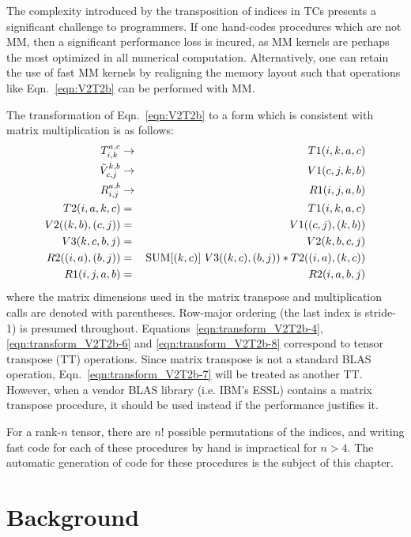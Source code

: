 \documentclass[letterpaper,12pt]{article}
\begin{document}
The complexity introduced by the transposition of indices in TCs presents a significant challenge to programmers.  If one hand-codes procedures which are not MM, then a significant performance loss is incured, as MM kernels are perhaps the most optimized in all numerical computation.  Alternatively, one can retain the use of fast MM kernels by realigning the memory layout such that operations like Eqn.~\ref{eqn:V2T2b} can be performed with MM.

The transformation of Eqn.~\ref{eqn:V2T2b} to a form which is consistent with matrix multiplication is as follows:
\begin{eqnarray}
 \label{eqn:transform_V2T2b-1}
 T^{a,c}_{i,k} &\rightarrow& T1(i,k,a,c) \\
 \label{eqn:transform_V2T2b-2}
 \tilde{V}^{k,b}_{c,j} &\rightarrow& V1(c,j,k,b) \\
 \label{eqn:transform_V2T2b-3}
 R^{a,b}_{i,j} &\rightarrow& R1(i,j,a,b) \\
 \label{eqn:transform_V2T2b-4}
 T2(i,a,k,c) &=& T1(i,k,a,c) \\
 \label{eqn:transform_V2T2b-5}
 V2((k,b),(c,j)) &=& V1((c,j),(k,b)) \\
 \label{eqn:transform_V2T2b-6}
 V3(k,c,b,j) &=& V2(k,b,c,j) \\
 \label{eqn:transform_V2T2b-7}
 R2((i,a),(b,j)) &=& {\rm SUM}[(k,c)]~V3((k,c),(b,j))*T2((i,a),(k,c)) \\
 \label{eqn:transform_V2T2b-8}
 R1(i,j,a,b) &=& R2(i,a,b,j)
\end{eqnarray}
where the matrix dimensions used in the matrix transpose and multiplication calls are denoted with parentheses.  Row-major ordering (the last index is stride-1) is presumed throughout.  Equations~\ref{eqn:transform_V2T2b-4}, \ref{eqn:transform_V2T2b-6} and \ref{eqn:transform_V2T2b-8} correspond to tensor transpose (TT) operations.  Since matrix transpose is not a standard BLAS operation, Eqn.~\ref{eqn:transform_V2T2b-7} will be treated as another TT.  However, when a vendor BLAS library (i.e. IBM's ESSL) contains a matrix transpose procedure, it should be used instead if the performance justifies it.

For a rank-$n$ tensor, there are $n!$ possible permutations of the indices, and writing fast code for each of these procedures by hand is impractical for $n>4$.  The automatic generation of code for these procedures is the subject of this chapter.

\section{Background}
\end{document}

